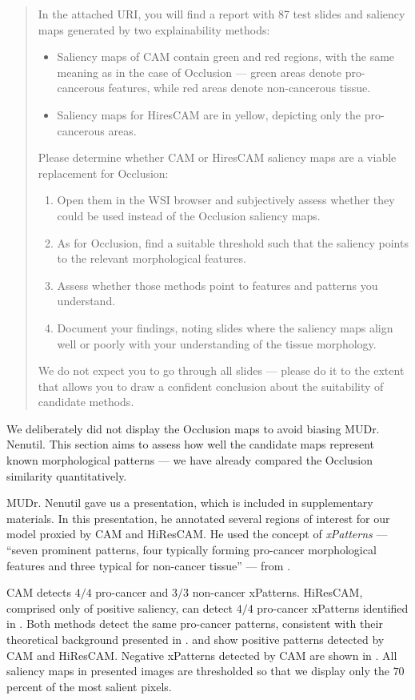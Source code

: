 \begin{doublebar}
\begin{quote}
In the attached URI, you will find a report with 87 test slides and saliency maps generated by two explainability methods:
\begin{itemize}
    \item Saliency maps of CAM contain green and red regions, with the same meaning as in the case of Occlusion --- green areas denote pro-cancerous features, while red areas denote non-cancerous tissue.
    \item Saliency maps for HiresCAM are in yellow, depicting only the pro-cancerous areas.
\end{itemize}
Please determine whether CAM or HiresCAM saliency maps are a viable replacement for Occlusion:
\begin{enumerate}
    \item Open them in the WSI browser and subjectively assess whether they could be used instead of the Occlusion saliency maps.
    \item As for Occlusion, find a suitable threshold such that the saliency points to the relevant morphological features.
    \item Assess whether those methods point to features and patterns you understand.
    \item Document your findings, noting slides where the saliency maps align well or poorly with your understanding of the tissue morphology.
\end{enumerate}
We do not expect you to go through all slides --- please do it to the extent that allows you to draw a confident conclusion about the suitability of candidate methods.
\end{quote}
\end{doublebar}
We deliberately did not display the Occlusion maps to avoid biasing MUDr. Nenutil.
This section aims to assess how well the candidate maps represent known morphological patterns --- we have already compared the Occlusion similarity quantitatively.

MUDr. Nenutil gave us a presentation, which is included in supplementary materials.
In this presentation, he annotated several regions of interest for our model proxied by CAM and HiResCAM.
He used the concept of \emph{xPatterns} --- ``seven prominent patterns, four
typically forming pro-cancer morphological features and three typical
for non-cancer tissue'' --- from \cite{gallo}.

CAM detects $4/4$ pro-cancer and $3/3$ non-cancer xPatterns.
HiResCAM, comprised only of positive saliency, can detect $4/4$ pro-cancer xPatterns identified in \cite{gallo}.
Both methods detect the same pro-cancer patterns, consistent with their theoretical background presented in .
 and  show positive patterns detected by CAM and HiResCAM.
Negative xPatterns detected by CAM are shown in .
All saliency maps in presented images are thresholded so that we display only the $70$ percent of the most salient pixels.

